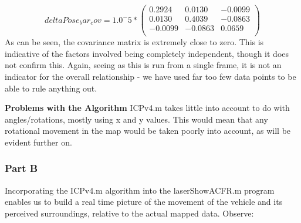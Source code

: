 		$$
		deltaPose_bar_cov = 1.0^-5 * 
		\begin{pmatrix}
		0.2924 & 0.0130 & -0.0099\\
		0.0130 & 0.4039 & -0.0863\\
		-0.0099  & -0.0863 & 0.0659\\
		\end{pmatrix}
		$$
		\newline
		As can be seen, the covariance matrix is extremely close to zero. This is indicative of the factors involved being completely independent, though it does not confirm this. Again, seeing as this is run from a single frame, it is not an indicator for the overall relationship - we have used far too few data points to be able to rule anything out.\newline \newline
		
		\textbf{Problems with the Algorithm}\newline
		ICPv4.m takes little into account to do with angles/rotations, mostly using x and y values. This would mean that any rotational movement in the map would be taken poorly into account, as will be evident further on.\newline \newline
				
			\pagebreak
		\subsubsection{Part B}
		\newline
		Incorporating the ICPv4.m algorithm into the laserShowACFR.m program enables us to build a real time picture of the movement of the vehicle and its perceived surroundings, relative to the actual mapped data. Observe:\newline \newline
		
